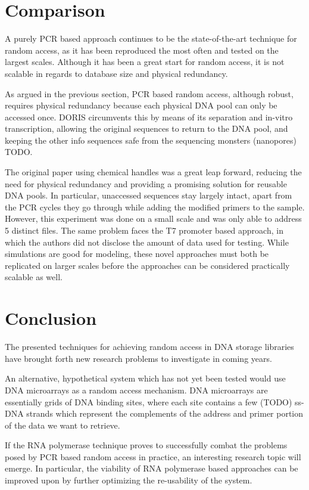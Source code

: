 \documentclass[a4paper,conference]{IEEEtran}
\begin{document}
\section{Comparison}
A purely PCR based approach continues to be the state-of-the-art technique for random access, as it has been reproduced the most often and tested on the largest scales. Although it has been a great start for random access, it is not scalable in regards to database size and physical redundancy. 

As argued in the previous section, PCR based random access, although robust, requires physical redundancy because each physical DNA pool can only be accessed once. DORIS circumvents this by means of its separation and in-vitro transcription, allowing the original sequences to return to the DNA pool, and keeping the other info sequences safe from the sequencing monsters (nanopores) TODO.

The original paper using chemical handles was a great leap forward, reducing the need for physical redundancy and providing a promising solution for reusable DNA pools. In particular, unaccessed sequences stay largely intact, apart from the PCR cycles they go through while adding the modified primers to the sample. However, this experiment was done on a small scale and was only able to address 5 distinct files. The same problem faces the T7 promoter based approach, in which the authors did not disclose the amount of data used for testing. While simulations are good for modeling, these novel approaches must both be replicated on larger scales before the approaches can be considered practically scalable as well. 



\section{Conclusion}
The presented techniques for achieving random access in DNA storage libraries have brought forth new research problems to investigate in coming years.

An alternative, hypothetical system which has not yet been tested would use DNA microarrays as a random access mechanism. DNA microarrays are essentially grids of DNA binding sites, where each site contains a few (TODO) ss-DNA strands which represent the complements of the address and primer portion of the data we want to retrieve. 

If the RNA polymerase technique proves to successfully combat the problems posed by PCR based random access in practice, an interesting research topic will emerge. In particular, the viability of RNA polymerase based approaches can be improved upon by further optimizing the re-usability of the system.
\end{document}
